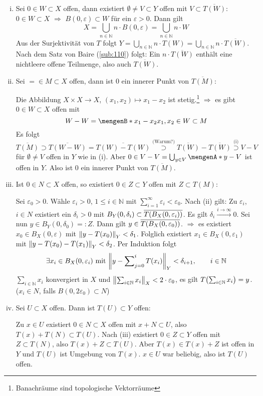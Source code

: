 \begin{enumerate}[(i)]
	\item Sei $0 \in W \subset X$ offen, dann existiert $\emptyset \not= V \subset Y$ offen mit $V \subset \overline{T(W)}$: $0 \in W \subset X$ $\Rightarrow $ 
	$B(0,\varepsilon) \subset W$ für ein $\varepsilon>0$. Dann gilt
	\[
		X=\bigcup_{n \in \mathds{N}} n \cdot B(0,\varepsilon) = \bigcup_{n \in \mathds{N}} n \cdot W
	\]
	Aus der Surjektivität von $T$ folgt $Y = \bigcup_{n \in \mathds{N} }n \cdot T(W) = \bigcup_{n \in \mathds{N}} n \cdot \overline{T(W)}$. Nach dem Satz von Baire 
	(\ref{sub:110}) folgt: Ein $n \cdot \overline{T(W)}$ enthält eine nichtleere offene Teilmenge, also auch $\overline{T(W)}$.
	\item Sei $= \in M \subset X$ offen, dann ist $0$ ein innerer Punkt von $\overline{T(M)}$: 
	
	Die Abbildung $X \times X \to X$, $(x_1,x_2) \mapsto x_1 -x_2$ ist stetig.\footnote{Banachräume sind topologische Vektorräume} $\Rightarrow$ es gibt $0 \in W \subset X$ 
	offen mit
	\[
		W - W = \set[x_1 -x_2]{x_1,x_2 \in W} \subset M 
	\]
	Es folgt 
	\[
		\overline{T(M)} \supset \overline{T(W-W)} = \overline{T(W)- T(W)} \stackrel{\text{(Warum?)}}{\supset} \overline{T(W)}- \overline{T(W)} \stackrel{\text{(i)}}{\supset}
		V -V
	\]
	für $\emptyset \not= V$ offen in $Y$ wie in (i). Aber $0 \in V-V = \bigcup_{y \in V}\set{y}- V$ ist offen in $Y$. Also ist $0$ ein innerer Punkt von $\overline{T(M)}$.
	\item Ist $0 \in N \subset X$ offen, so existiert $0 \in Z \subset Y$ offen mit $Z \subset T(M)$:
	
	Sei $\varepsilon_0 >0$. Wähle $\varepsilon_i >0$, $1 \le i \in \mathds{N}$ mit $\sum_{i=1}^{\infty} \varepsilon_i < \varepsilon_0$. Nach (ii) gilt: Zu $\varepsilon_i$, 
	$i \in N$ existiert ein $\delta_i >0$ mit $B_Y(0,\delta_i) \subset \overline{T \enbrace*{B_X(0,\varepsilon_i)}}$. Es gilt $\delta_i \xrightarrow{i \to \infty} 0$. Sei 
	nun $y \in B_Y(0,\delta_0) =: Z$. Dann gilt $y \in \overline{T \enbrace*{B_X(0,\varepsilon_0)}}$. $\Rightarrow $ es existiert $x_0 \in B_X(0,\varepsilon)$ mit 
	$\norm[Y]{y- T(x_0)}< \delta_1$. Folglich existiert $x_1 \in B_X(0,\varepsilon_1)$ mit $\norm[Y]{y- T(x_0) - T(x_1)} < \delta_2$. Per Induktion folgt
	\[
		\exists x_i \in B_X(0,\varepsilon_i) \text{ mit } \norm[Y]{y- \sum\nolimits_{j=0}^{i}T(x_i)} < \delta_{i+1}, \qquad i \in \mathds{N} 
	\]
	$\sum_{i \in \mathds{N}}x_i$ konvergiert in $X$ und $\norm[X]{\sum_{i\in \mathds{N}} x_i} < 2 \cdot \varepsilon_0 $, es gilt $T \enbrace*{\sum_{i \in \mathds{N}}x_i}=y$.
	($x_i \in N$, falls $B(0,2 \varepsilon_0) \subset N$)
	\item Sei $U \subset X$ offen. Dann ist $T(U) \subset Y$ offen:
	
	Zu $x \in U$ existiert $0 \in N \subset X$ offen mit $x+ N \subset U$, also $T(x)+ T(N)\subset T(U)$. Nach (iii) existiert $0 \in Z \subset Y$ offen mit $Z \subset T(N)$,
	also $T(x)+ Z \subset T(U)$. Aber $T(x) \in T(x)+ Z$ ist offen in $Y$ und $T(U)$ ist Umgebung von $T(x)$. $x \in U$ war beliebig, also ist $T(U)$ offen. \bewende
\end{enumerate}

